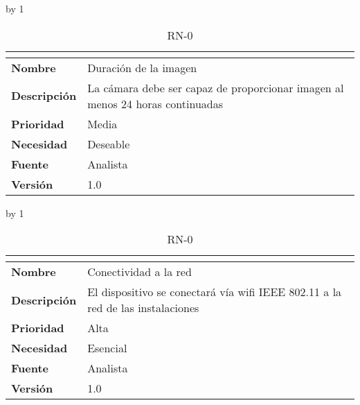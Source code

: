 \advance\rn by 1
\begin{table}[H]
	\caption{RN-0\number\rn}
	\begin{tabular}{|l|p{}|}
		\hline
		\multicolumn{2}{|c|}{\cellcolor[HTML]{BFBFBF}{\color[HTML]{000000} \textbf{RN-0\number\rn}}} \\ \hline
		\textbf{Nombre}      & Duración de la imagen                                                          \\ \hline
		\textbf{Descripción} & La cámara debe ser capaz de proporcionar imagen al menos  24 horas continuadas \\ \hline
		\textbf{Prioridad}   & Media                                                                          \\ \hline
		\textbf{Necesidad}   & Deseable                                                                       \\ \hline
		\textbf{Fuente}      & Analista                                                                       \\ \hline
		\textbf{Versión}     & 1.0                                                                            \\ \hline
	\end{tabular}
\end{table}
\advance\rn by 1
\begin{table}[H]
	\caption{RN-0\number\rn}
	\begin{tabular}{|l|p{}|}
		\hline
		\multicolumn{2}{|c|}{\cellcolor[HTML]{BFBFBF}{\color[HTML]{000000} \textbf{RN-0\number\rn}}} \\ \hline
		\textbf{Nombre}      & Conectividad a la red                                                          \\ \hline
		\textbf{Descripción} & El dispositivo se conectará vía wifi IEEE 802.11 a la red de las instalaciones \\ \hline
		\textbf{Prioridad}   & Alta                                                                           \\ \hline
		\textbf{Necesidad}   & Esencial                                                                       \\ \hline
		\textbf{Fuente}      & Analista                                                                       \\ \hline
		\textbf{Versión}     & 1.0                                                                            \\ \hline
	\end{tabular}
\end{table}
